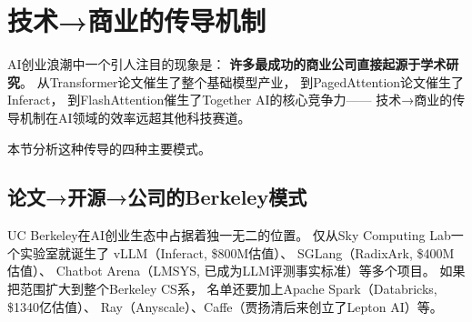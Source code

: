 \section{技术→商业的传导机制}
\label{sec:patterns-pipeline}

AI创业浪潮中一个引人注目的现象是：
\textbf{许多最成功的商业公司直接起源于学术研究}。
从Transformer论文催生了整个基础模型产业，
到PagedAttention论文催生了Inferact，
到FlashAttention催生了Together AI的核心竞争力——
技术→商业的传导机制在AI领域的效率远超其他科技赛道。

本节分析这种传导的四种主要模式。

\subsection{论文→开源→公司的Berkeley模式}

UC Berkeley在AI创业生态中占据着独一无二的位置。
仅从Sky Computing Lab一个实验室就诞生了
vLLM（Inferact, \$800M估值）、
SGLang（RadixArk, \$400M估值）、
Chatbot Arena（LMSYS, 已成为LLM评测事实标准）等多个项目。
如果把范围扩大到整个Berkeley CS系，
名单还要加上Apache Spark（Databricks, \$1340亿估值）、
Ray（Anyscale）、Caffe（贾扬清后来创立了Lepton AI）等。

